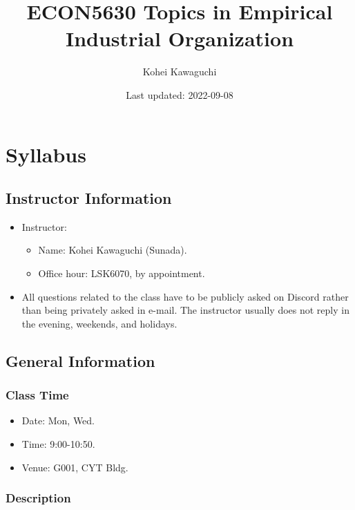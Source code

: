 \documentclass[
]{book}
\title{ECON5630 Topics in Empirical Industrial Organization}
\author{Kohei Kawaguchi}
\date{Last updated: 2022-09-08}
\providecommand{\tightlist}{%
  \setlength{\itemsep}{0pt}\setlength{\parskip}{0pt}}
\begin{document}
\maketitle

{
\setcounter{tocdepth}{1}
\tableofcontents
}
\hypertarget{syllabus}{%
\chapter{Syllabus}\label{syllabus}}

\hypertarget{instructor-information}{%
\section{Instructor Information}\label{instructor-information}}

\begin{itemize}
\tightlist
\item
  Instructor:

  \begin{itemize}
  \tightlist
  \item
    Name: Kohei Kawaguchi (Sunada).
  \item
    Office hour: LSK6070, by appointment.
  \end{itemize}
\item
  All questions related to the class have to be publicly asked on Discord rather than being privately asked in e-mail. The instructor usually does not reply in the evening, weekends, and holidays.
\end{itemize}

\hypertarget{general-information}{%
\section{General Information}\label{general-information}}

\hypertarget{class-time}{%
\subsection{Class Time}\label{class-time}}

\begin{itemize}
\tightlist
\item
  Date: Mon, Wed.
\item
  Time: 9:00-10:50.
\item
  Venue: G001, CYT Bldg.
\end{itemize}

\hypertarget{description}{%
\subsection{Description}\label{description}}
\end{document}
